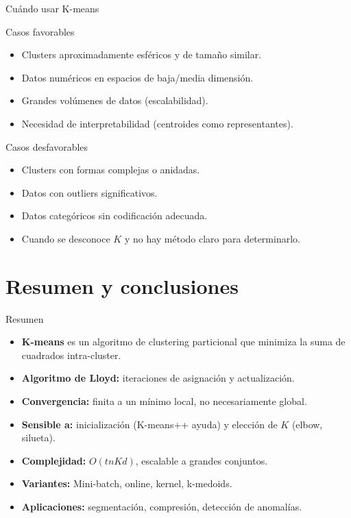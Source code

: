 \documentclass[aspectratio=169]{beamer}
\begin{document}
\begin{frame}{Cuándo usar K-means}
    \begin{block}{Casos favorables}
        \begin{itemize}
            \item Clusters aproximadamente esféricos y de tamaño similar.
            \item Datos numéricos en espacios de baja/media dimensión.
            \item Grandes volúmenes de datos (escalabilidad).
            \item Necesidad de interpretabilidad (centroides como representantes).
        \end{itemize}
    \end{block}
    
    \begin{block}{Casos desfavorables}
        \begin{itemize}
            \item Clusters con formas complejas o anidadas.
            \item Datos con outliers significativos.
            \item Datos categóricos sin codificación adecuada.
            \item Cuando se desconoce \(K\) y no hay método claro para determinarlo.
        \end{itemize}
    \end{block}
\end{frame}

\section{Resumen y conclusiones}

\begin{frame}{Resumen}
    \begin{itemize}
        \item \textbf{K-means} es un algoritmo de clustering particional que minimiza la suma de cuadrados intra-cluster.
        \item \textbf{Algoritmo de Lloyd:} iteraciones de asignación y actualización.
        \item \textbf{Convergencia:} finita a un mínimo local, no necesariamente global.
        \item \textbf{Sensible a:} inicialización (K-means++ ayuda) y elección de \(K\) (elbow, silueta).
        \item \textbf{Complejidad:} \(O(t n K d)\), escalable a grandes conjuntos.
        \item \textbf{Variantes:} Mini-batch, online, kernel, k-medoids.
        \item \textbf{Aplicaciones:} segmentación, compresión, detección de anomalías.
    \end{itemize}
\end{frame}
\end{document}
